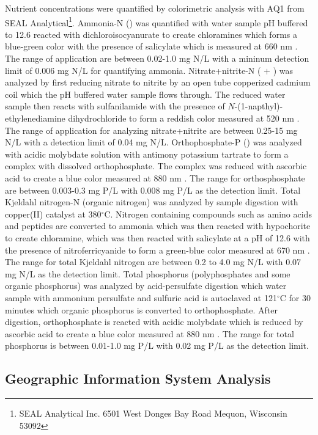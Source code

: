 Nutrient concentrations were quantified by colorimetric analysis with  AQ1 from SEAL Analytical\footnote{SEAL Analytical Inc. 6501 West Donges Bay Road Mequon, Wisconsin 53092}. Ammonia-N () was quantified with water sample pH buffered to 12.6 reacted with dichloroisocyanurate to create chloramines which  forms a blue-green color with the presence of salicylate which is measured at 660 nm \cite{usepa_method_1993-2}. The range of application are between 0.02-1.0 mg N/L with a mininum detection limit of 0.006 mg N/L for quantifying ammonia.  Nitrate+nitrite-N ( $+$ ) was analyzed by first reducing nitrate to nitrite by an open tube copperized cadmium coil which the pH buffered water sample flows through. The reduced water sample then reacts with sulfanilamide with the presence of $N$-(1-napthyl)-ethylenediamine dihydrochloride to form a reddish color measured at 520 nm \cite{usepa_method_1993}. The range of application for analyzing nitrate+nitrite are between 0.25-15 mg N/L with a detection limit of 0.04 mg N/L.  Orthophosphate-P () was analyzed with acidic molybdate solution with antimony potassium tartrate to form a complex with dissolved orthophosphate. The complex was reduced with ascorbic acid to create a blue color measured at 880 nm \cite{usepa_method_1993-3}. The range for orthosphosphate are between 0.003-0.3 mg P/L with 0.008 mg P/L as the detection limit. Total Kjeldahl nitrogen-N (organic nitrogen) was analyzed by sample digestion with copper(II) catalyst at 380$^\circ$C. Nitrogen containing compounds such as amino acids and peptides are converted to ammonia which was then reacted with hypochorite to create chloramine, which was then reacted with salicylate at a pH of 12.6 with the presence of nitroferricyanide to form a green-blue color measured at 670 nm \cite{usepa_method_1993-1}. The range for total Kjeldahl nitrogen are between 0.2 to 4.0 mg N/L with 0.07 mg N/L as the detection limit. Total phosphorus (polyphosphates and some organic phosphorus) was analyzed by acid-persulfate digestion which water sample with ammonium persulfate and sulfuric acid is autoclaved at 121$^\circ$C for 30 minutes which organic phosphorus is converted to orthophosphate. After digestion, orthophosphate is reacted with acidic molybdate which is reduced by ascorbic acid to create a blue color measured at 880 nm \cite{usepa_method_1993-3}. The range for total phosphorus is between 0.01-1.0 mg P/L with 0.02 mg P/L as the detection limit. 


\subsection{Geographic Information System Analysis}

